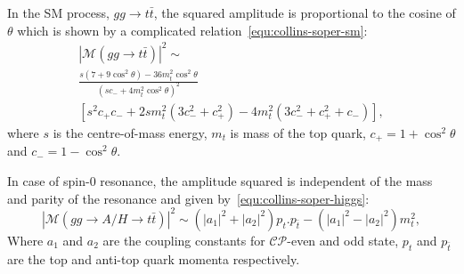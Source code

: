 In the SM process, $gg\rightarrow t\bar t$, the squared amplitude is proportional to the cosine of $\theta$ which is shown by a complicated relation~\ref{equ:collins-soper-sm}:
\begin{equation}\begin{split}
{\left|\mathcal{M}\left(gg\rightarrow t\bar t \right)\right|}^{2} \sim \\
\frac{s\left(7 + 9\cos^{2}\theta \right) - 36m_{t}^{2}\cos^{2}\theta}{\left( sc_{-} + 4m_{t}^{2}\cos^{2}\theta \right)^{2}}\\
\left[ s^{2}c_{+}c_{-} + 2sm_{t}^{2}\left(3c_{-}^{2} + c_{+}^{2} \right) -4m_{t}^{2} \left(3c_{-}^{2}+c_{+}^{2}+c_{-} \right)\right],
\label{equ:collins-soper-sm}
\end{split}
\end{equation} 
where $s$ is the centre-of-mass energy, $m_{t}$ is mass of the top quark, $c_{+}=1+\cos^{2}\theta$ and $c_{-}=1-\cos^{2}\theta$.

In case of spin-0 resonance, the amplitude squared is independent of the mass and parity of the resonance and given by~\ref{equ:collins-soper-higgs}:
\begin{equation}\label{equ:collins-soper-higgs}
{\left|\mathcal{M}\left(gg\rightarrow A/H\rightarrow t\bar t \right)\right|}^{2} \sim 
\left(\left|a_{1} \right|^{2} + \left|a_{2} \right|^{2} \right)p_{t}.p_{\bar t}-
\left(\left|a_{1} \right|^{2} - \left|a_{2} \right|^{2} \right)m_{t}^{2},
\end{equation} 
Where $a_{1}$ and $a_{2}$ are the coupling constants for $\mathcal{CP}$-even and odd state, $p_{t}$ and $p_{\bar t}$ are the top and anti-top quark momenta respectively.

